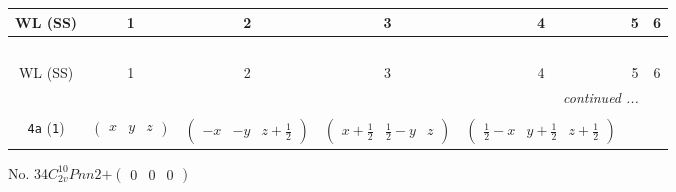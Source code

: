 \documentclass[fleqn,9pt,landscape]{jsarticle}
\begin{document}
\begin{center}
\renewcommand{\arraystretch}{1.2}
\begin{longtable}{ccccccc}
 \hline \hline
WL (SS) & 1 & 2 & 3 & 4 & 5 & 6 \\ \hline \endfirsthead

\multicolumn{6}{l}{\tablename\ \thetable{}} \\
 \hline \hline
WL (SS) & 1 & 2 & 3 & 4 & 5 & 6 \\ \hline \endhead

 \hline \hline
\multicolumn{6}{r}{\footnotesize\it continued ...} \\ \endfoot

 \hline \hline
\multicolumn{6}{r}{} \\ \endlastfoot

{\tt 4a} ({\tt 1}) & $ \begin{pmatrix} x & y & z \end{pmatrix} $ & $ \begin{pmatrix} - x & - y & z + \frac{1}{2} \end{pmatrix} $ & $ \begin{pmatrix} x + \frac{1}{2} & \frac{1}{2} - y & z \end{pmatrix} $ & $ \begin{pmatrix} \frac{1}{2} - x & y + \frac{1}{2} & z + \frac{1}{2} \end{pmatrix} $ \\
\end{longtable}
\end{center}
\newpage
No. 34\quad$C_{2v}^{10}$\quad$Pnn2$\quad[ orthorhombic ]\quad$+\begin{pmatrix} 0 & 0 & 0 \end{pmatrix}$
\end{document}
